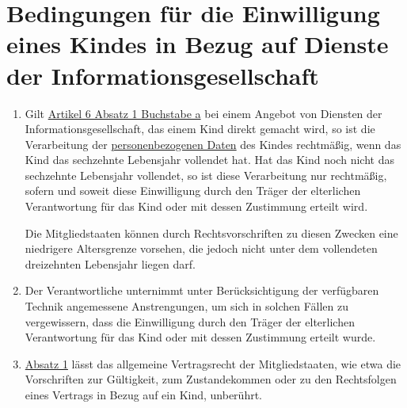 \chapter{Bedingungen für die Einwilligung eines Kindes in Bezug auf Dienste der Informationsgesellschaft}
\label{ch:8}


\begin{enumerate}

  \item Gilt \hyperref[itm:06-1a]{Artikel 6 Absatz 1 Buchstabe a} bei einem Angebot von Diensten der
   Informationsgesellschaft, das einem Kind direkt gemacht wird, so ist die Verarbeitung der \hyperref[itm:04-1]{personenbezogenen Daten}
   des Kindes rechtmäßig, wenn das Kind das sechzehnte Lebensjahr vollendet hat. Hat das Kind noch nicht das sechzehnte
   Lebensjahr vollendet, so ist diese Verarbeitung nur rechtmäßig, sofern und soweit diese Einwilligung durch den
   Träger der elterlichen Verantwortung für das Kind oder mit dessen Zustimmung erteilt wird. 
  \label{itm:08-1}

   Die Mitgliedstaaten können durch Rechtsvorschriften zu diesen Zwecken eine niedrigere Altersgrenze vorsehen, die
   jedoch nicht unter dem vollendeten dreizehnten Lebensjahr liegen darf.

  \item Der Verantwortliche unternimmt unter Berücksichtigung der verfügbaren Technik angemessene Anstrengungen, um sich
   in solchen Fällen zu vergewissern, dass die Einwilligung durch den Träger der elterlichen Verantwortung für das Kind
   oder mit dessen Zustimmung erteilt wurde.
  \label{itm:08-2}

  \item \hyperref[itm:08-1]{Absatz 1} lässt das allgemeine Vertragsrecht der Mitgliedstaaten, wie etwa die Vorschriften
   zur Gültigkeit, zum Zustandekommen oder zu den Rechtsfolgen eines Vertrags in Bezug auf ein Kind, unberührt.
  \label{itm:08-3}

\end{enumerate}


